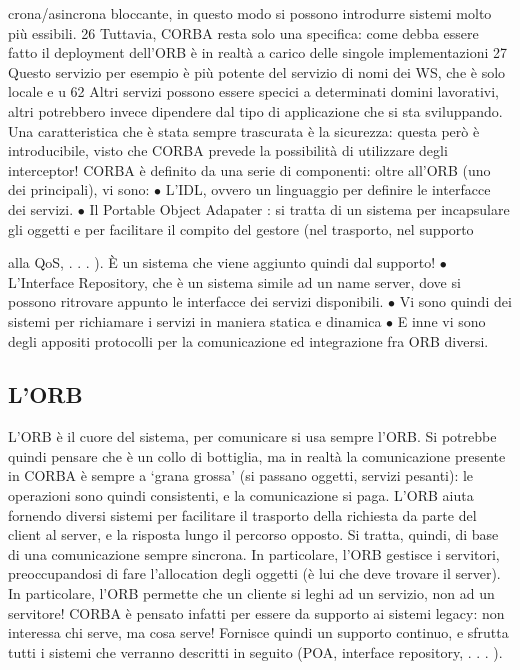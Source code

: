 crona/asincrona bloccante, in questo modo si possono introdurre sistemi
molto più essibili.
26 Tuttavia, CORBA resta solo una specifica: come debba essere fatto il deployment
dell'ORB è in realtà a carico delle singole implementazioni
27 Questo servizio per esempio è più potente del servizio di nomi dei WS, che è solo locale
e u
62
Altri servizi possono essere specici a determinati domini lavorativi, altri potrebbero invece dipendere dal tipo di
applicazione che si sta sviluppando.
Una caratteristica che è stata sempre trascurata è la sicurezza: questa però è introducibile, visto che CORBA prevede 
la possibilità di utilizzare degli interceptor!
CORBA è definito da una serie di componenti: oltre all'ORB (uno dei
principali), vi sono:
$\bullet$ L'IDL, ovvero un linguaggio per definire le interfacce dei servizi.
$\bullet$ Il Portable Object Adapater : si tratta di un sistema per incapsulare gli
oggetti e per facilitare il compito del gestore (nel trasporto, nel supporto

alla QoS, . . . ). È un sistema che viene aggiunto quindi dal supporto!
$\bullet$ L'Interface Repository, che è un sistema simile ad un name server, dove si
possono ritrovare appunto le interfacce dei servizi disponibili.
$\bullet$ Vi sono quindi dei sistemi per richiamare i servizi in maniera statica e
dinamica
$\bullet$ E inne vi sono degli appositi protocolli per la comunicazione ed integrazione fra ORB diversi.
\subsection{L'ORB}
L'ORB è il cuore del sistema, per comunicare si usa sempre l'ORB. Si potrebbe
quindi pensare che è un collo di bottiglia, ma in realtà la comunicazione presente
in CORBA è sempre a {`}grana grossa' (si passano oggetti, servizi pesanti): le
operazioni sono quindi consistenti, e la comunicazione si paga. L'ORB aiuta
fornendo diversi sistemi per facilitare il trasporto della richiesta da parte del
client al server, e la risposta lungo il percorso opposto. Si tratta, quindi, di base
di una comunicazione sempre sincrona.
In particolare, l'ORB gestisce i servitori, preoccupandosi di fare l'allocation
degli oggetti (è lui che deve trovare il server). In particolare, l'ORB permette
che un cliente si leghi ad un servizio, non ad un servitore! CORBA è pensato
infatti per essere da supporto ai sistemi legacy: non interessa chi serve, ma
cosa serve! Fornisce quindi un supporto continuo, e sfrutta tutti i sistemi che
verranno descritti in seguito (POA, interface repository, . . . ).
